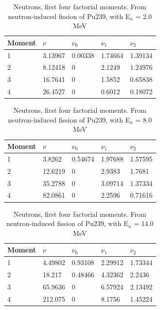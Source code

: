 \documentclass[]{article}
\begin{document}
\begin{table} [H]
	\centering
	\caption{Neutrons, first four factorial moments. From neutron-induced fission of Pu239, with E$_n$ = 2.0 MeV }
	\begin{tabularx}{\textwidth}{XXXXX} \hline
		\label{tab:Pu239_n_moments_2}
		Moment & $\nu$ & $\nu_0$ & $\nu_1$ & $\nu_2$ \\ \hline
		1 & 3.13967 & 0.00338 & 1.74664 & 1.39134\\
		2 & 8.12418 & 0 & 2.1249 & 1.24976\\
		3 & 16.7641 & 0 & 1.5852 & 0.65838\\
		4 & 26.4527 & 0 & 0.6012 & 0.18072\\ 
	\end{tabularx}
\end{table}

\begin{table} [H]
	\centering
	\caption{Neutrons, first four factorial moments. From neutron-induced fission of Pu239, with E$_n$ = 8.0 MeV }
	\begin{tabularx}{\textwidth}{XXXXX} \hline
		\label{tab:Pu239_n_moments_8}
		Moment & $\nu$ & $\nu_0$ & $\nu_1$ & $\nu_2$ \\ \hline
		1 & 3.8262 & 0.54674 & 1.97688 & 1.57595\\
		2 & 12.6219 & 0 & 2.9383 & 1.7681\\
		3 & 35.2788 & 0 & 3.09714 & 1.37334\\
		4 & 82.0861 & 0 & 2.2596 & 0.71616\\ 
	\end{tabularx}
\end{table}

\begin{table} [H]
	\centering
	\caption{Neutrons, first four factorial moments. From neutron-induced fission of Pu239, with E$_n$ = 14.0 MeV }
	\begin{tabularx}{\textwidth}{XXXXX} \hline
		\label{tab:Pu239_n_moments_14}
		Moment & $\nu$ & $\nu_0$ & $\nu_1$ & $\nu_2$ \\ \hline
		1 & 4.49802 & 0.93108 & 2.29912 & 1.73344\\
		2 & 18.217 & 0.48466 & 4.32362 & 2.2436\\
		3 & 65.9636 & 0 & 6.57924 & 2.13492\\
		4 & 212.075 & 0 & 8.1756 & 1.45224\\ 
	\end{tabularx}
\end{table}
\end{document}
